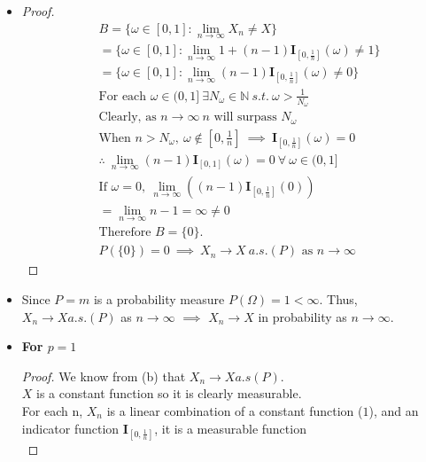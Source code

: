 \documentclass[12pt,letterpaper, onecolumn]{exam}
\newcommand{\nat}{\mathbb{N}}
\newcommand{\cutelim}{\lim\limits_{n\to\infty}}
\newcommand{\nti}{n \to \infty}
\begin{document}
\begin{questions}
\begin{solution}
\begin{itemize}
            \item[(b)] \begin{proof}
                \begin{align*}
                    & B = \{\omega \in [0, 1]: \cutelim X_n \neq X\} \\
                    & = \{ \omega \in [0, 1]: \cutelim 1 + (n-1) \mathbf{I}_{[0, \tfrac{1}{n}]}(\omega) \neq 1 \} \\
                    & = \{ \omega \in [0, 1]: \cutelim (n-1) \mathbf{I}_{[0, \tfrac{1}{n}]}(\omega) \neq 0 \} \\
                    & \textrm{For each } \omega \in (0, 1] \: \exists N_\omega \in \nat \: s.t. \: \omega > \frac{1}{N_\omega} \\
                    & \textrm{Clearly, as } \nti \: n \textrm{ will surpass } N_\omega \\
                    & \textrm{When } n > N_\omega, \: \omega\notin [0, \tfrac{1}{n}] \: \implies \: \mathbf{I}_{[0, \tfrac{1}{n}]}(\omega) = 0 \\
                    & \therefore \: \cutelim (n - 1) \mathbf{I}_{[0, 1]}(\omega) = 0 \: \forall \: \omega \in (0, 1] \\
                    & \textrm{If } \omega = 0, \: \cutelim((n - 1)\mathbf{I}_{[0, \tfrac{1}{n}]}(0)) \\
                    & = \cutelim n - 1 = \infty \neq 0 \\ 
                    & \textrm{Therefore } B = \{0\}. \\
                    & P(\{0\}) = 0 \: \implies \: X_n \to X \: a.s.(P) \textrm{ as } \nti 
                \end{align*}
            \end{proof}
            \item[(c)] Since $P = m$ is a probability measure $P(\Omega) = 1 < \infty$. Thus, $X_n \to X a.s.(P)$ as $\nti$ $\implies$ $X_n \to X$ in probability as $\nti$.
            \item[(d)] 
            \textbf{For $p = 1$}
            \begin{proof}
                We know from (b) that $X_n \to X  a.s(P)$. \\
                $X$ is a constant function so it is clearly measurable. \\
                For each n, $X_n$ is a linear combination of a constant function ($1$), and an indicator function $\mathbf{I}_{[0, \tfrac{1}{n}]}$, it is a measurable function \\

\end{proof}
\end{itemize}
\end{solution}
\end{questions}
\end{document}
